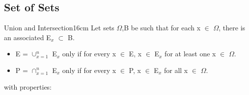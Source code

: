 \subsection{ Set of Sets } 

	\begin{definition}{Union and Intersection}{16cm}
		Let sets $\Omega$,B be such that for each x $\in$ $\Omega$,
		there is an associated E$_x$ $\subset$ B.
		\begin{itemize}[leftmargin=1cm, itemsep=0.1cm]
			\item E = $\cup_{x=1}^{n}$ E$_x$ only if for every x $\in$ E,
			x $\in$ E$_x$ for at least one x $\in$ $\Omega$.

			\item P = $\cap_{x=1}^{n}$ E$_x$ only if for every x $\in$ P,
			x $\in$ E$_x$ for all x $\in$ $\Omega$.
		\end{itemize}
		with properties:
	\end{definition}

